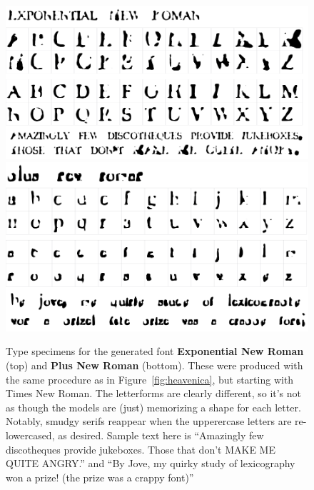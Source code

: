 \documentclass[twocolumn]{article}
\begin{document}
\begin{figure}[tp]
\centering
\includegraphics[width=0.9 \linewidth]{expnewroman} \\[0.5in]
\includegraphics[width=0.9 \linewidth]{plusnewroman} \\
\caption{
  Type specimens for the generated font {\bf Exponential New Roman} (top)
  and {\bf Plus New Roman} (bottom). These were produced with
  the same procedure as in Figure~\ref{fig:heavenica}, but starting
  with Times New Roman. The letterforms are clearly different, so
  it's not as though the models are (just) memorizing a shape for
  each letter. Notably, smudgy serifs reappear when the upperercase letters
  are re-lowercased, as desired.
  Sample text here is ``Amazingly few discotheques provide jukeboxes.
  Those that don't MAKE ME QUITE ANGRY.'' and
  ``By Jove, my quirky study of lexicography won a prize! (the prize
  was a crappy font)''
} \label{fig:roman}
\end{figure}
\end{document}
